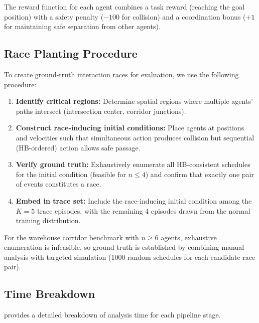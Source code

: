 \documentclass[11pt]{article}
\begin{document}
The reward function for each agent combines a task reward (reaching the
goal position) with a safety penalty ($-100$ for collision) and a
coordination bonus ($+1$ for maintaining safe separation from other agents).

\subsection{Race Planting Procedure}

To create ground-truth interaction races for evaluation, we use the
following procedure:

\begin{enumerate}[nosep]
\item \textbf{Identify critical regions:} Determine spatial regions where
multiple agents' paths intersect (intersection center, corridor junctions).
\item \textbf{Construct race-inducing initial conditions:} Place agents at
positions and velocities such that simultaneous action produces collision
but sequential (HB-ordered) action allows safe passage.
\item \textbf{Verify ground truth:} Exhaustively enumerate all HB-consistent
schedules for the initial condition (feasible for $n \leq 4$) and confirm
that exactly one pair of events constitutes a race.
\item \textbf{Embed in trace set:} Include the race-inducing initial condition
among the $K = 5$ trace episodes, with the remaining 4 episodes drawn from
the normal training distribution.
\end{enumerate}

For the warehouse corridor benchmark with $n \geq 6$ agents, exhaustive
enumeration is infeasible, so ground truth is established by combining
manual analysis with targeted simulation (1000 random schedules for each
candidate race pair).

\subsection{Time Breakdown}

 provides a detailed breakdown of analysis time
for each pipeline stage.
\end{document}
